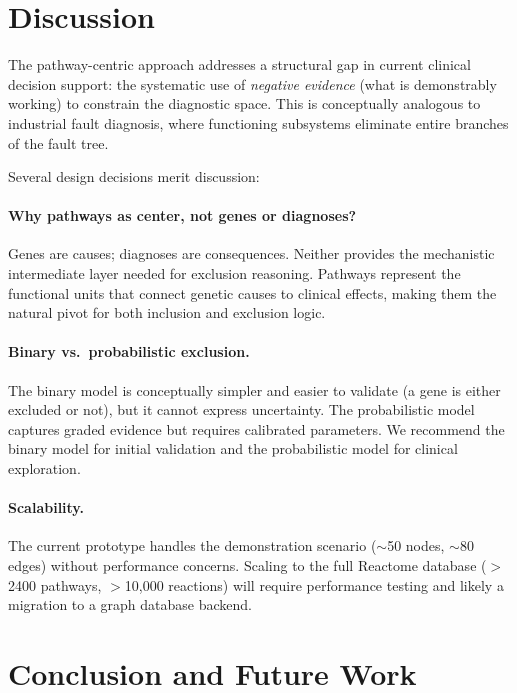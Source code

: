 \documentclass[12pt,a4paper]{article}
\begin{document}
\section{Discussion}
\label{sec:discussion}

The pathway-centric approach addresses a structural gap in current clinical decision support: the systematic use of \emph{negative evidence} (what is demonstrably working) to constrain the diagnostic space. This is conceptually analogous to industrial fault diagnosis, where functioning subsystems eliminate entire branches of the fault tree.

Several design decisions merit discussion:

\paragraph{Why pathways as center, not genes or diagnoses?} Genes are causes; diagnoses are consequences. Neither provides the mechanistic intermediate layer needed for exclusion reasoning. Pathways represent the functional units that connect genetic causes to clinical effects, making them the natural pivot for both inclusion and exclusion logic.

\paragraph{Binary vs.\ probabilistic exclusion.} The binary model is conceptually simpler and easier to validate (a gene is either excluded or not), but it cannot express uncertainty. The probabilistic model captures graded evidence but requires calibrated parameters. We recommend the binary model for initial validation and the probabilistic model for clinical exploration.

\paragraph{Scalability.} The current prototype handles the demonstration scenario ($\sim$50 nodes, $\sim$80 edges) without performance concerns. Scaling to the full Reactome database ($>$2400 pathways, $>$10{,}000 reactions) will require performance testing and likely a migration to a graph database backend.

\section{Conclusion and Future Work}
\label{sec:conclusion}
\end{document}
